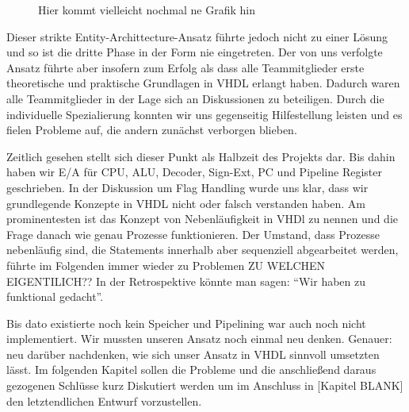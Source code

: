 \documentclass[paper=a4,fontsize=12pt,twocolumn]{scrreprt}
\begin{document}
\begin{figure}
    \centering
    \caption{Hier kommt vielleicht nochmal ne Grafik hin}
    \label{fig:my_label}
\end{figure}

Dieser strikte Entity-Archittecture-Ansatz führte jedoch nicht zu einer Lösung und so ist die dritte Phase in der Form nie eingetreten.
Der von uns verfolgte Ansatz führte aber insofern zum Erfolg als dass alle Teammitglieder erste theoretische und praktische Grundlagen in VHDL erlangt haben.
Dadurch waren alle Teammitglieder in der Lage sich an Diskussionen zu beteiligen.
Durch die individuelle Spezialierung konnten wir uns gegenseitig Hilfestellung leisten und es fielen Probleme auf, die andern zunächst verborgen blieben.

Zeitlich gesehen stellt sich dieser Punkt als Halbzeit des Projekts dar.
Bis dahin haben wir E/A für CPU, ALU, Decoder, Sign-Ext, PC und Pipeline Register geschrieben.
In der Diskussion um Flag Handling wurde uns klar, dass wir grundlegende Konzepte in VHDL nicht oder falsch verstanden haben.
Am prominentesten ist das Konzept von Nebenläufigkeit in VHDl zu nennen und die Frage danach wie genau Prozesse funktionieren.
Der Umstand, dass Prozesse nebenläufig sind, die Statements innerhalb aber sequenziell abgearbeitet werden, führte im Folgenden immer wieder zu Problemen {\color{red}ZU WELCHEN EIGENTILICH??}
In der Retrospektive könnte man sagen: \enquote{Wir haben zu funktional gedacht}.





Bis dato existierte noch kein Speicher und Pipelining war auch noch nicht implementiert.
Wir mussten unseren Ansatz noch einmal neu denken. Genauer: neu darüber nachdenken, wie sich unser Ansatz in VHDL sinnvoll umsetzten lässt.
Im folgenden Kapitel sollen die Probleme und die anschließend daraus gezogenen Schlüsse kurz Diskutiert werden um im Anschluss in [Kapitel BLANK] den letztendlichen Entwurf vorzustellen. 
\end{document}
